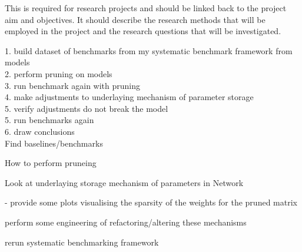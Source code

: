 \documentclass[../../D1.tex]{subfiles}
\begin{document}
This is required for research projects and should be linked
back to the project aim and objectives. It should describe the research methods that
will be employed in the project and the research questions that will be investigated.

1. build dataset of benchmarks from my systematic benchmark framework from models\\
2. perform pruning on models\\
3. run benchmark again with pruning\\
4. make adjustments to underlaying mechanism of parameter storage\\
5. verify adjustments do not break the model\\
5. run benchmarks again\\
6. draw conclusions\\

Find baselines/benchmarks

How to perform pruneing



Look at underlaying storage mechanism of parameters in Network

 - provide some plots visualising the sparsity of the weights for the pruned matrix

perform some engineering of refactoring/altering these mechanisms

rerun systematic benchmarking framework
\end{document}
